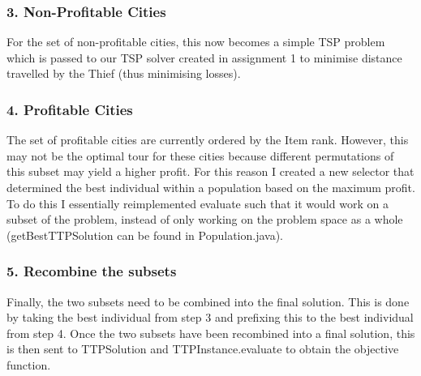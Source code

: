 \documentclass[a4paper,12pt]{article}
\begin{document}
\subsubsection*{3. Non-Profitable Cities}
For the set of non-profitable cities, this now becomes a simple TSP problem which is passed to our TSP solver created in assignment 1 to minimise distance travelled by the Thief (thus minimising losses).

\subsubsection*{4. Profitable Cities}
The set of profitable cities are currently ordered by the Item rank. However, this may not be the optimal tour for these cities because different permutations of this subset may yield a higher profit. For this reason I created a new selector that determined the best individual within a population based on the maximum profit. To do this I essentially reimplemented evaluate such that it would work on a subset of the problem, instead of only working on the problem space as a whole (getBestTTPSolution can be found in Population.java).

\subsubsection*{5. Recombine the subsets}
Finally, the two subsets need to be combined into the final solution. This is done by taking the best individual from step 3 and prefixing this to the best individual from step 4. Once the two subsets have been recombined into a final solution, this is then sent to TTPSolution and TTPInstance.evaluate to obtain the objective function.
\end{document}
